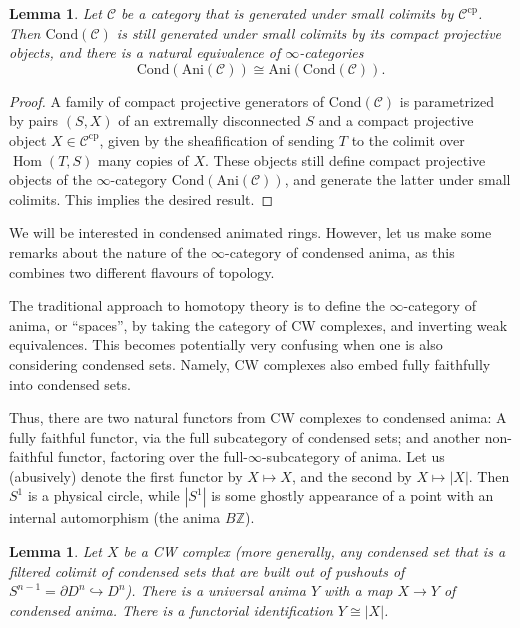 \documentclass[11pt]{amsbook}
\DeclareMathOperator{\Hom}{Hom}
\numberwithin{equation}{section}
\numberwithin{theorem}{section}
\newtheorem{lemma}[theorem]{Lemma}
\theoremstyle{definition}
\begin{document}
\begin{lemma}\label{lem:condensedanimation} Let $\mathcal C$ be a category that is generated under small colimits by $\mathcal C^{\mathrm{cp}}$. Then $\mathrm{Cond}(\mathcal C)$ is still generated under small colimits by its compact projective objects, and there is a natural equivalence of $\infty$-categories
\[
\mathrm{Cond}(\mathrm{Ani}(\mathcal C))\cong \mathrm{Ani}(\mathrm{Cond}(\mathcal C)).
\]
\end{lemma}

\begin{proof} A family of compact projective generators of $\mathrm{Cond}(\mathcal C)$ is parametrized by pairs $(S,X)$ of an extremally disconnected $S$ and a compact projective object $X\in \mathcal C^{\mathrm{cp}}$, given by the sheafification of sending $T$ to the colimit over $\Hom(T,S)$ many copies of $X$. These objects still define compact projective objects of the $\infty$-category $\mathrm{Cond}(\mathrm{Ani}(\mathcal C))$, and generate the latter under small colimits. This implies the desired result.
\end{proof}

We will be interested in condensed animated rings. However, let us make some remarks about the nature of the $\infty$-category of condensed anima, as this combines two different flavours of topology.

The traditional approach to homotopy theory is to define the $\infty$-category of anima, or ``spaces'', by taking the category of CW complexes, and inverting weak equivalences. This becomes potentially very confusing when one is also considering condensed sets. Namely, CW complexes also embed fully faithfully into condensed sets.

Thus, there are two natural functors from CW complexes to condensed anima: A fully faithful functor, via the full subcategory of condensed sets; and another non-faithful functor, factoring over the full-$\infty$-subcategory of anima. Let us (abusively) denote the first functor by $X\mapsto X$, and the second by $X\mapsto |X|$. Then $S^1$ is a physical circle, while $|S^1|$ is some ghostly appearance of a point with an internal automorphism (the anima $B\mathbb Z$).

\begin{lemma} Let $X$ be a CW complex (more generally, any condensed set that is a filtered colimit of condensed sets that are built out of pushouts of $S^{n-1}=\partial D^n\hookrightarrow D^n$). There is a universal anima $Y$ with a map $X\to Y$ of condensed anima. There is a functorial identification $Y\cong|X|$.
\end{lemma}
\end{document}
